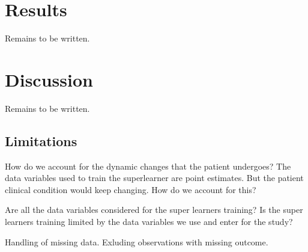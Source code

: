 \documentclass[10pt,letterpaper]{article}\usepackage[]{graphicx}\usepackage[]{color}
\begin{document}
\section*{Results}
Remains to be written.
\section*{Discussion}
Remains to be written.


\subsection*{Limitations}
How do we account for the dynamic changes that the patient undergoes? The data
variables used to train the superlearner are point estimates. But the patient
clinical condition would keep changing. How do we account for this?

Are all the data variables considered for the super learners training? Is the
super learners training limited by the data variables we use and enter for the
study?

Handling of missing data. Exluding observations with missing outcome.


\end{document}
